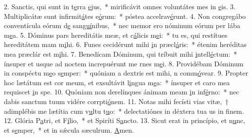 2. Sanctis, qui sunt in t\uline{e}rra \uline{e}jus,~* mirificávit omnes voluntátes mes in \uline{e}is.
3. Multiplicátæ sunt infirmit\uline{á}tes e\uline{ó}rum:~* póstea accelrav\uline{é}runt.
4. Non congregábo conventícula eórum d\uline{e} san\uline{guí}nibus,~* nec memor ero nóminum eórum per lába m\uline{e}a.
5. Dóminus pars hereditátis meæ, et c\uline{á}licis m\uline{e}i:~* tu es, qui restítues hereditátem mam m\uline{i}hi.
6. Funes cecidérunt mihi \uline{i}n præcl\uline{á}ris:~* étenim heréditas mea præclár est m\uline{i}hi.
7. Benedícam Dóminum, qui tríbuit mihi \uline{i}ntell\uline{é}ctum:~* ínsuper et usque ad noctem increpuérunt me rnes m\uline{e}i.
8. Providébam Dóminum in conspéctu m\uline{e}o s\uline{e}mper:~* quóniam a dextris est mihi, n comm\uline{ó}vear.
9. Propter hoc lætátum est cor meum, et exsultávit l\uline{i}ngua m\uline{e}a:~* ínsuper et caro mea requiscet \uline{i}n spe.
10. Quóniam non derelínques ánimam meam \uline{i}n inf\uline{é}rno:~* nec dabis sanctum tuum vidére corrpti\uline{ó}nem.
11. Notas mihi fecísti vias vitæ,~† adimplébis me lætítia cum v\uline{u}ltu t\uline{u}o:~* delectatiónes in déxtera tua us in f\uline{i}nem.
12. Glória P\uline{a}tri, et F\uline{í}lio,~* et Spiríti S\uline{a}ncto.
13. Sicut erat in princípio, et n\uline{u}nc, et s\uline{e}mper,~* et in sǽcula sæculrum. \uline{A}men.

